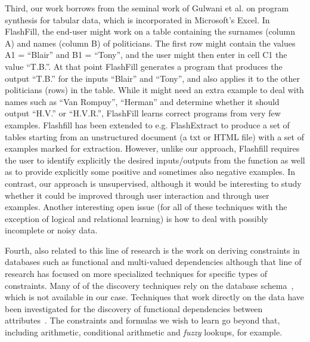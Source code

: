 Third, our work borrows from the seminal work of Gulwani et al. \cite{flashfill} on program synthesis for tabular data, which is incorporated in Microsoft’s Excel. In FlashFill, the end-user might work on a table containing the surnames (column A) and names (column B) of politicians. The first row might contain the values A1 = ``Blair'' and B1 = ``Tony'', and the user might then enter in cell C1 the value ``T.B.''. At that point FlashFill generates a program that produces the output ``T.B.'' for the inputs ``Blair'' and ``Tony'', and also applies it to the other politicians (rows) in the table. While it might need an extra example to deal with names such as ``Van Rompuy'', ``Herman'' and determine whether it should output ``H.V.'' or ``H.V.R.'', FlashFill learns correct programs from very few examples. Flashfill has been extended to e.g. FlashExtract \cite{flashextract} to produce a set of tables starting from an unstructured document (a txt or HTML file) with a set of examples marked for extraction. However, unlike our approach, Flashfill requires the user to identify explicitly the desired inputs/outputs from the function as well as to provide explicitly some positive and sometimes also negative examples.  In contrast, our approach is unsupervised, although it would be interesting to study whether it could be improved through user interaction and through user examples.  Another interesting open issue (for all of these techniques with the exception of logical and relational learning) is how to deal with possibly incomplete or noisy data.

Fourth, also related to this line of research is the work on deriving constraints in databases such as functional and multi-valued dependencies \cite{savnik, Mannila-Raiha} although that line of research has focused on more specialized techniques for specific types of constraints. Many of of the discovery techniques rely on the database schema~\cite{flach_dependency_discovery}, which is not available in our case. Techniques that work directly on the data have been investigated for the discovery of functional dependencies between attributes~\cite{tane_dependency_discovery}. The constraints and formulas we wish to learn go beyond that, including arithmetic, conditional arithmetic and \textit{fuzzy} lookups, for example.


